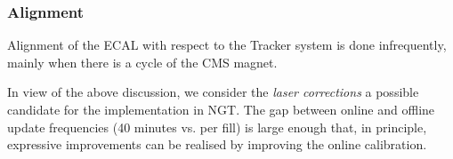 \subsubsection{Alignment}

Alignment of the ECAL with respect to the Tracker system is done infrequently, 
mainly when there is a cycle of the CMS magnet.

In view of the above discussion, we consider the \emph{laser corrections} a possible candidate for the implementation in NGT.
The gap between online and offline update frequencies (40 minutes vs. per fill) is large enough that, in principle, expressive improvements can be realised by improving the online calibration.